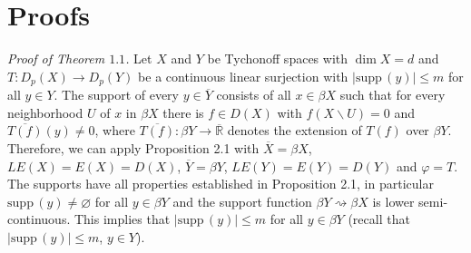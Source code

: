 \documentclass[12pt]{amsart}
\def\supp{{\mathrm {supp}}\,}
\begin{document}
\section{Proofs}
\textit{ Proof of Theorem $1.1$.}
Let $X$ and $Y$ be Tychonoff spaces with 
$\dim X=d$  and $T:D_p(X)\to D_p(Y)$ be a continuous linear
surjection with $|\supp(y)|\leq m$ for all $y\in Y$. 
The support of every $y\in\overline Y$ consists of all $x\in\beta X$ such that for every neighborhood $U$ of $x$ in $\beta X$ there is $f\in D(X)$ with $f(X\backslash U)=0$ and $\overline{T(f)}(y)\neq 0$, where $\overline{T(f)}:\beta Y\to\overline{\mathbb R}$ denotes the extension of $T(f)$ over $\beta Y$. Therefore, we can apply Proposition 2.1 with $\overline X=\beta X$, $LE(X)=E(X)=D(X)$, $\overline Y=\beta Y$, $LE(Y)=E(Y)=D(Y)$ and $\varphi=T$. The supports have all properties established in Proposition 2.1, in particular $\supp(y)\neq\varnothing$ for all $y\in\beta Y$ and the support function 
$\beta Y\rightsquigarrow\beta X$ is lower semi-continuous.  This implies that 
$|\supp(y)|\leq m$ for all $y\in\beta Y$ (recall that $|\supp(y)|\leq m$, $y\in Y$). 
\end{document}
